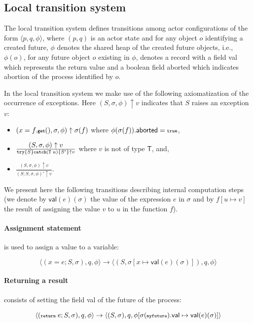 \subsection{Local transition system}
The local transition system defines transitions among actor configurations of the form $\langle p,q,\phi\rangle $,
where $(p,q)$ is an actor state and for any object $o$ identifying a created future,  $\phi$ denotes the shared heap
of the created future objects, i.e., $\phi(o)$, for any future object $o$ existing in $\phi$,  denotes a record with a field
\textsf{val} which represents the return value  and a boolean field \textsf{aborted} which indicates abortion of the process
identified by $o$.

In the local  transition system we make use of the following axiomatization of the occurrence of exceptions.
Here $(S,\sigma,\phi)\uparrow v$ indicates that $S$  raises an exception $v$:
\begin{itemize}
 \item $ (x=f.{\textnormal{\textbf{{\scriptsize\texttt{get}}}}}(),\sigma,\phi) \uparrow \sigma(f)$ where $\phi(\sigma(f)).\mathsf{aborted}={\scriptsize\texttt{true}}$,
 \item $\frac{\displaystyle (S,\sigma,\phi)\uparrow v}{{\scriptsize\texttt{try}}\{ S \}{\scriptsize\texttt{catch}}({\scriptsize\texttt{T}} \; u)\{S'\}\uparrow v}$ where $v$ is not of type $\mathsf{T}$, and, 
 \item $\frac{\displaystyle (S,\sigma,\phi)\uparrow v}{\displaystyle (S;S,\sigma,\phi) '\uparrow v}$.
\end{itemize}

We present here the following transitions describing internal computation steps
(we denote by $ \textsf{val}(e)(\sigma)$ the value of the expression $e$ in $\sigma$
and by $f[u\mapsto v]$ the result of assigning the value $v$ to $u$ in the function $f$).

\paragraph*{Assignment statement} is used to assign a value to a variable:

$$ \langle (x=e; S, \sigma), q, \phi\rangle \rightarrow \langle (S, \sigma [x \mapsto \textsf{val}(e)(\sigma)]), q, \phi\rangle $$

\paragraph*{Returning a result} consists of setting the field 
\textsf{val} of the future of the process:

$$
\langle (\textbf{{\scriptsize\texttt{return}}}\; e ;S , \sigma), q, \phi\rangle \rightarrow 
\langle (S, \sigma), q, \phi[\sigma({\scriptsize\texttt{myfuture}}).\textsf{val} \mapsto 
\textsf{val}(e)(\sigma)]\rangle
$$

